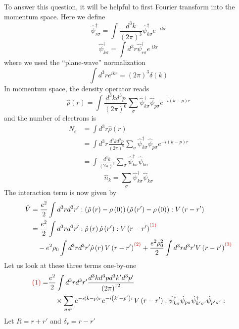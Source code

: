 To answer this question, it will be helpful to first Fourier transform into the momentum space. Here we define
\[ \hat{\psi}_{r\sigma}^{\dagger}=\int{\frac{d^3k}{\left( 2\pi \right) ^3}\hat{\psi}_{k\sigma}^{\dagger}e^{-ikr}}\]
\[ \hat{\psi}_{k\sigma}^{\dagger}=\int{d^3r\hat{\psi}_{r\sigma}^{\dagger}e^{\,\,ikr}}\]
where we used the ``plane-wave'' normalization
\[ \int{d^3re^{ikr}}=\left( 2\pi \right) ^3\delta \left( k \right) \]
In momentum space, the density operator reads
\[ \hat{\rho}\left( r \right) =\int{\frac{d^3kd^3p}{\left( 2\pi \right) ^6}\sum_{\sigma}{\hat{\psi}_{k\sigma}^{\dagger}\hat{\psi}_{p\sigma}e^{-i\left( k-p \right) r}}}\]
and the number of electrons is
\begin{align*}
    N_e&=\int{d^3r\hat{\rho}\left( r \right)}\\
    &=\int{d^3r\frac{d^3kd^3p}{\left( 2\pi \right) ^6}\sum_{\sigma}{\hat{\psi}_{k\sigma}^{\dagger}\hat{\psi}_{p\sigma}e^{-i\left( k-p \right) r}}}\\
    &=\int{\frac{d^3k}{\left( 2\pi \right) ^3}\sum_{\sigma}{\hat{\psi}_{k\sigma}^{\dagger}\hat{\psi}_{k\sigma}}}
\end{align*}
\[ \hat{n}_k=\sum_{\sigma}{\hat{\psi}_{k\sigma}^{\dagger}\hat{\psi}_{k\sigma}}\]
The interaction term is now given by
\begin{align*}
    \hat{V}&=\frac{e^2}{2}\int{d^3rd^3r':\left( \hat{\rho}\left( r \right) -\rho \left( 0 \right) \right) \left( \hat{\rho}\left( r' \right) -\rho \left( 0 \right) \right) :V\left( r-r' \right)}\\
    &=\frac{e^2}{2}\int{d^3rd^3r':\hat{\rho}\left( r \right) \hat{\rho}\left( r' \right) :V\left( r-r' \right)}^{{\color{red} \left( 1 \right) }}\\
    &\quad -e^2\rho _0\int{d^3rd^3r'\hat{\rho}\left( r \right) V\left( r-r' \right)}^{{\color{red} \left( 2 \right) }}+\frac{e^2\rho _{0}^{2}}{2}\int{d^3rd^3r'V\left( r-r' \right)}^{{\color{red} \left( 3 \right) }}
\end{align*}
Let us look at these three terms one-by-one
\begin{align*}
    {\color{red} \left( 1 \right) }=&\frac{e^2}{2}\int{d^3rd^3r'\frac{d^3kd^3pd^3k'd^3p'}{\left( 2\pi \right) ^{12}}}\\
    &\quad \times \sum_{\sigma \sigma '}{e^{-i\left( k-p \right) r}e^{-i\left( k'-p' \right) r}V\left( r-r' \right) :\hat{\psi}_{k\sigma}^{\dagger}\hat{\psi}_{p\sigma}\hat{\psi}_{k'\sigma '}^{\dagger}\hat{\psi}_{p'\sigma '}:}
\end{align*}
Let $R=r+r'$ and $\delta _r=r-r'$
